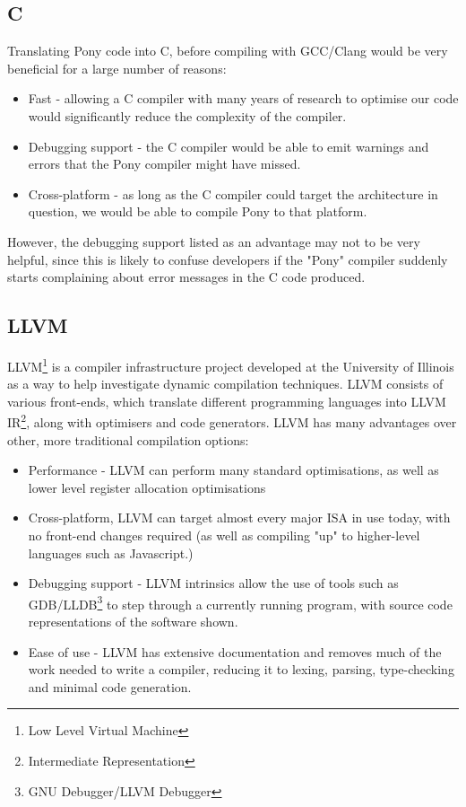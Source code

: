 \documentclass[11pt,a4paper]{report}
\begin{document}
\subsection{C}

Translating Pony code into C, before compiling with GCC/Clang would be very beneficial for a large number of reasons:
\begin{itemize}[noitemsep]
\item Fast - allowing a C compiler with many years of research to optimise our code would significantly reduce the complexity of the compiler.
\item Debugging support - the C compiler would be able to emit warnings and errors that the Pony compiler might have missed.
\item Cross-platform - as long as the C compiler could target the architecture in question, we would be able to compile Pony to that platform.
\end{itemize}

However, the debugging support listed as an advantage may not to be very helpful, since this is likely to confuse developers if the "Pony" compiler suddenly starts complaining about error messages in the C code produced.

\subsection{LLVM}

LLVM\footnote{Low Level Virtual Machine} is a compiler infrastructure project developed at the University of Illinois as a way to help investigate dynamic compilation techniques\cite{Lattner:MSThesis02}.
LLVM consists of various front-ends, which translate different programming languages into LLVM IR\footnote{Intermediate Representation}, along with optimisers and code generators.
LLVM has many advantages over other, more traditional compilation options:
\begin{itemize}[noitemsep]
\item Performance - LLVM can perform many standard optimisations, as well as lower level register allocation optimisations
\item Cross-platform, LLVM can target almost every major ISA in use today\cite{llvm-svn}, with no front-end changes required (as well as compiling "up" to higher-level languages such as Javascript.)
\item Debugging support - LLVM intrinsics allow the use of tools such as GDB/LLDB\footnote{GNU Debugger/LLVM Debugger} to step through a currently running program, with source code representations of the software shown.
\item Ease of use - LLVM has extensive documentation and removes much of the work needed to write a compiler, reducing it to lexing, parsing, type-checking and minimal code generation.
\end{itemize}
\end{document}
